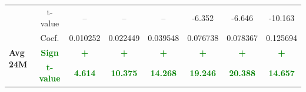 \documentclass[11pt,english,a4paper,hidelinks]{book}
\begin{document}
\begin{table}[H]
\begin{tabular}{lccccccc}
            & t-value & --  & --  & --  & -6.352 & -6.646 & -10.163 \\
        \cmidrule{1-8}
        \multirow{3}{*}{\textbf{Avg 24M}}
            & Coef.   & 0.010252  & 0.022449  & 0.039548  & 0.076738  & 0.078367  & 0.125694  \\
            & \textbf{\textcolor{green}{Sign}}
                     & \textbf{\textcolor{green}{+}}
                     & \textbf{\textcolor{green}{+}}
                     & \textbf{\textcolor{green}{+}}
                     & \textbf{\textcolor{green}{+}}
                     & \textbf{\textcolor{green}{+}}
                     & \textbf{\textcolor{green}{+}} \\
            & \textbf{\textcolor{green}{t-value}}
                     & \textbf{\textcolor{green}{4.614}}
                     & \textbf{\textcolor{green}{10.375}}
                     & \textbf{\textcolor{green}{14.268}}
                     & \textbf{\textcolor{green}{19.246}}
                     & \textbf{\textcolor{green}{20.388}}
                     & \textbf{\textcolor{green}{14.657}} \\
        \bottomrule
    \end{tabular}
    \label{tab:asia_oceania_quality_consistency}
\end{table}
\end{document}
